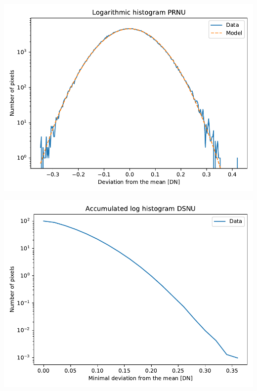 \documentclass[a4paper,twoside,12pt,american,hidelinks]{article}
\begin{document}
\begin{center}
\includegraphics[height=0.45\textheight,keepaspectratio]{OP1/PlotLogarithmicHistogramPRNU.pdf}
\end{center}
\vfill
\newpage
\begin{center}
\includegraphics[height=0.45\textheight,keepaspectratio]{OP1/PlotAccumulatedLogHistogramDSNU.pdf}
\end{center}
\end{document}
